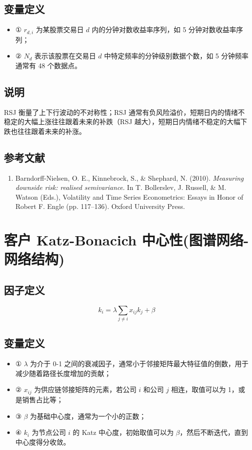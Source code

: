 \documentclass{article}
\begin{document}
\subsection{变量定义}
\begin{itemize}
    \item ① \( r_{d,i} \) 为某股票交易日 \( d \) 内的分钟对数收益率序列，如 5 分钟对数收益率序列；
    \item ② \( N_d \) 表示该股票在交易日 \( d \) 中特定频率的分钟级别数据个数，如 5 分钟频率通常有 48 个数据点。
\end{itemize}

\subsection{说明}
RSJ 衡量了上下行波动的不对称性；RSJ 通常有负风险溢价，短期日内的情绪不稳定的大幅上涨往往跟着未来的补跌（RSJ 越大），短期日内情绪不稳定的大幅下跌也往往跟着未来的补涨。

\subsection{参考文献}
\begin{enumerate}
    \item Barndorff-Nielsen, O. E., Kinnebrock, S., \& Shephard, N. (2010). \textit{Measuring downside risk: realised semivariance}. In T. Bollerslev, J. Russell, \& M. Watson (Eds.), Volatility and Time Series Econometrics: Essays in Honor of Robert F. Engle (pp. 117–136). Oxford University Press.
\end{enumerate}

\section{客户 Katz-Bonacich 中心性(图谱网络-网络结构)}

\subsection{因子定义}
\begin{equation}
    k_i = \lambda \sum_{j \neq i} x_{ij} k_j + \beta
\end{equation}

\subsection{变量定义}
\begin{itemize}
    \item ① \(\lambda\) 为介于 0-1 之间的衰减因子，通常小于邻接矩阵最大特征值的倒数，用于减少随着路径长度增加的贡献；
    \item ② \(x_{ij}\) 为供应链邻接矩阵的元素，若公司 \(i\) 和公司 \(j\) 相连，取值可以为 1，或是销售占比等；
    \item ③ \(\beta\) 为基础中心度，通常为一个小的正数；
    \item ④ \(k_i\) 为节点公司 \(i\) 的 Katz 中心度，初始取值可以为 \(\beta\)，然后不断迭代，直到中心度得分收敛。
\end{itemize}
\end{document}
